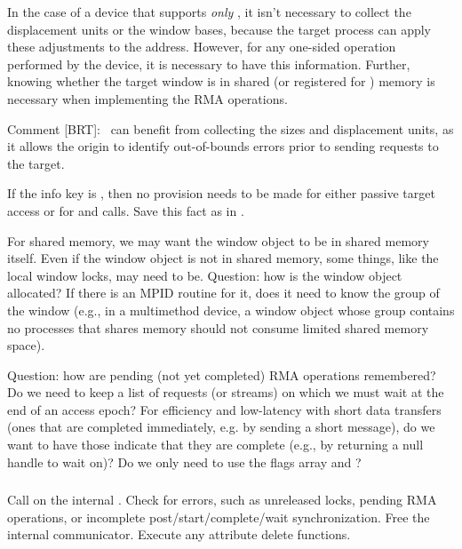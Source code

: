 \documentclass{article}
\begin{document}
In the case of a device that supports \emph{only} \tcpname, it isn't
necessary to collect the displacement units or the window bases,
because the target process can apply these adjustments to the
address.  However, for any one-sided operation performed by the device, it is
necessary to 
have this information.  Further, knowing whether the target window is
in shared (or registered for \vianame) memory is necessary when
implementing the RMA operations.

Comment [BRT]: \tcpname\ can benefit from collecting the sizes and
displacement units, as it allows the origin to identify out-of-bounds
errors prior to sending requests to the target.

If the info key  is ,
then no provision needs to be made for either passive target access or for
 and  calls.  Save this
fact as  in .

For shared memory, we may want the window object to be in shared
memory itself.  Even if the window object is not in shared memory,
some things, like the local window locks, may need to be.  Question:
how is the window object allocated?  If there is an MPID routine for
it, does it need to know the group of the window (e.g., in a
multimethod device, a window object whose group contains no processes
that shares memory should not consume limited shared memory space).

Question: how are pending (not yet completed) RMA operations
remembered?  Do we need to keep a list of requests (or streams) on which we
must 
wait at the end of an access epoch?  For efficiency and low-latency
with short data transfers (ones that are completed immediately,
e.g. by sending a short message), do we want to have those indicate
that they are complete (e.g., by returning a null handle to wait on)?
Do we only need to use the flags array and ?

\subsubsection{}
Call  on the internal .
Check for errors, such as unreleased locks, pending RMA operations, or
incomplete 
post/start/complete/wait synchronization.
Free the internal communicator.  Execute any attribute delete functions.
\end{document}
